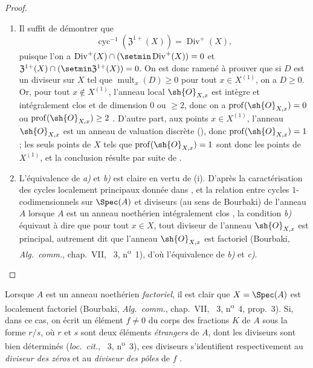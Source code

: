 \begin{proof}
\begin{enumerate}[label=(\roman*)]
  \item Il suffit de démontrer que
\[
\label{IV.21.6.9.1}
  \operatorname{cyc}^{-1}(\mathfrak{Z}^{1+}(X))=\operatorname{Div}^+(X),
  \tag{21.6.9.1}
\]
puisque l'on a $\operatorname{Div}^+(X)\cap(\setmin\operatorname{Div}^+(X))=0$ et $\mathfrak{Z}^{1+}(X)\cap(\setmin\mathfrak{Z}^{1+}(X))=0$.
On est donc ramené à prouver que si $D$ est un diviseur sur $X$ tel que $\operatorname{mult}_x(D)\geq0$ pour tout $x\in X^{(1)}$, on a $D\geq0$.
Or, pour tout $x\notin X^{(1)}$, l'anneau local $\sh{O}_{X,x}$ est intègre et intégralement clos et
de dimension $0$ ou $\geq2$, donc on a $\operatorname{prof}(\sh{O}_{X,x})=0$ ou $\operatorname{prof}(\sh{O}_{X,x})\geq2$ .
D'autre part, aux points $x\in X^{(1)}$, l'anneau $\sh{O}_{X,x}$ est un anneau de valuation discrète (), donc $\operatorname{prof}(\sh{O}_{X,x})=1$ ;
les seuls points de $X$ tels que $\operatorname{prof}(\sh{O}_{X,x})=1$ sont donc les points de $X^{(1)}$, et la conclusion résulte par suite de .

  \item L'équivalence de \emph{a)} et \emph{b)} est claire en vertu de (i).
D'après la caractérisation des cycles localement principaux donnée dans , et la relation entre cycles $1$-codimensionnels sur $\Spec(A)$ et diviseurs (au sens de Bourbaki) de l'anneau $A$ lorsque $A$ est un anneau noethérien intégralement clos , la condition \emph{b)} équivaut à dire que pour tout $x\in X$, tout diviseur de l'anneau $\sh{O}_{X,x}$ est principal, autrement dit que l'anneau $\sh{O}_{X,x}$ est factoriel (Bourbaki, \emph{Alg.\ comm.}, chap.~VII, \textsection~3, n\textsuperscript{o}~1), d'où l'équivalence de \emph{b)} et \emph{c)}.
\end{enumerate}
\end{proof}

\begin{env}[21.6.9.2]
\label{IV.21.6.9.2}
Lorsque $A$ est un anneau noethérien \emph{factoriel}, il est clair que $X=\Spec(A)$ est localement factoriel (Bourbaki, \emph{Alg.\ comm.}, chap.~VII, \textsection~3, n\textsuperscript{o}~4, prop.~3).
Si, dans ce cas, on écrit un élément $f\neq0$ du corps des fractions $K$ de $A$ sous la forme $r/s$, où $r$ et $s$ sont deux éléments \emph{étrangers} de $A$, dont les diviseurs sont bien déterminés (\emph{loc.\ cit.}, \textsection~3, n\textsuperscript{o}~3), ces diviseurs s'identifient respectivement au \emph{diviseur des zéros} et au \emph{diviseur des pôles} de $f$ .
\end{env}

